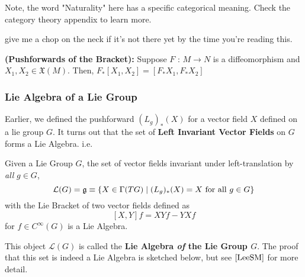 \documentclass[11pt]{article}
\begin{document}
\begin{dottedbox}
  Note, the word "Naturality" here has a specific categorical meaning. Check the category theory appendix to learn more. \begin{note}
    {give me a chop on the neck if it's not there yet by the time you're reading this.}
  \end{note}
\end{dottedbox}

\begin{dottedbox}
  \begin{corollary}
    \textbf{(Pushforwards of the Bracket):} Suppose $F \text{ : } M \rightarrow N$ is a diffeomorphism and $X_1, X_2 \in \mathfrak{X}(M)$. Then, $F_{*}[X_1, X_2] = [F_* X_1, F_* X_2]$
  \end{corollary}
\end{dottedbox}


\subsubsection{Lie Algebra of a Lie Group}
Earlier, we defined the pushforward $(L_g)_*(X)$ for a vector field $X$ defined on a lie group $G$. It turns out that the set of \textbf{Left Invariant Vector Fields} on $G$ forms a Lie Algebra. i.e.

\begin{redbox}
  \begin{theorem}
  Given a Lie Group $G$, the set of vector fields invariant under left-translation by \emph{all} $g \in G$,
  \[ \mathcal{L}(G) = \mathfrak{g} \equiv \left\{ X \in \Gamma(TG) \;\vert\; (L_g)_*(X) = X \text{ for all } g \in G \right\}  \]
  with the Lie Bracket of two vector fields defined as 
  \[ [X, Y]f = XYf - YXf \]
  for $f \in C^{\infty}(G)$ is a Lie Algebra.
  \end{theorem}
\end{redbox}
\vskip 0.5cm
This object $\mathcal{L}(G)$ is called the \textbf{Lie Algebra \emph{of} the Lie Group $G$}. The proof that this set is indeed a Lie Algebra is sketched below, but see $\cite{LeeSM}$ for more detail.
\vskip 0.5cm
\end{document}
